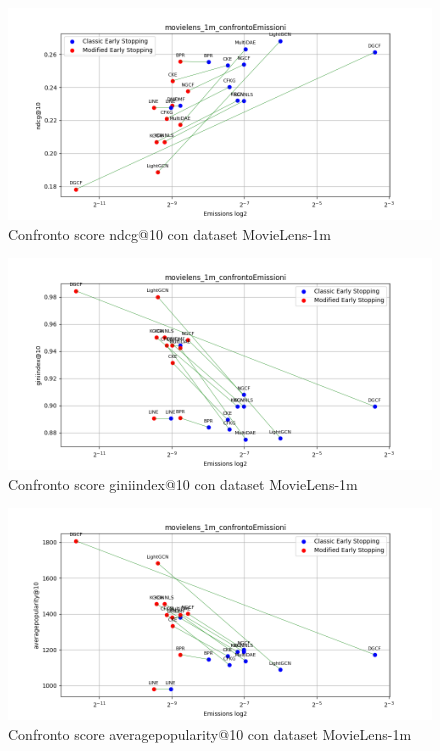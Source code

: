 \begin{figure}[H]
    \centering
    \includegraphics[width=\linewidth, trim=0 0 0 0]{images/ndcg@10_movielens_1m_comparison.png}
    \caption{Confronto score ndcg@10 con dataset MovieLens-1m}
    
\end{figure}

\begin{figure}[H]
    \centering
    \includegraphics[width=\linewidth, trim=0 0 0 0]{images/giniindex@10_movielens_1m_comparison.png}
    \caption{Confronto score giniindex@10 con dataset MovieLens-1m}
\end{figure}

\begin{figure}[H]
    \centering
    \includegraphics[width=\linewidth, trim=0 0 0 0]{images/averagepopularity@10_movielens_1m_comparison.png}
    \caption{Confronto score averagepopularity@10 con dataset MovieLens-1m}
\end{figure}





